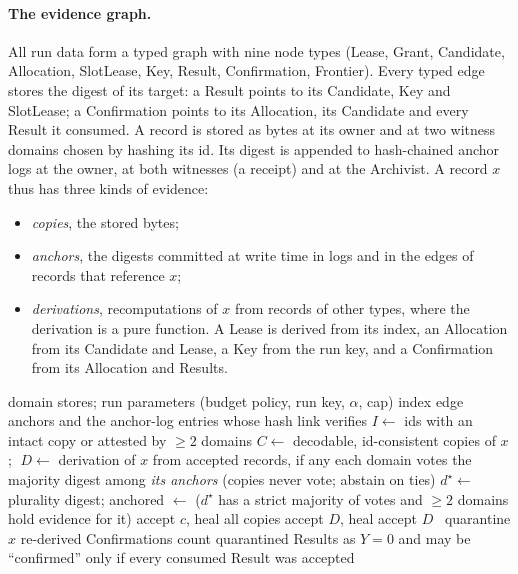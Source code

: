 \documentclass[pdflatex,sn-mathphys-num]{sn-jnl}
\theoremstyle{thmstyleone}
\theoremstyle{thmstyletwo}
\theoremstyle{thmstylethree}
\begin{document}
\paragraph{The evidence graph.} All run data form a typed graph with nine node types (Lease, Grant, Candidate, Allocation, SlotLease, Key, Result, Confirmation, Frontier). Every typed edge stores the digest of its target: a Result points to its Candidate, Key and SlotLease; a Confirmation points to its Allocation, its Candidate and every Result it consumed. A record is stored as bytes at its owner and at two witness domains chosen by hashing its id. Its digest is appended to hash-chained anchor logs at the owner, at both witnesses (a receipt) and at the Archivist. A record $x$ thus has three kinds of evidence:
\begin{itemize}
\item \emph{copies}, the stored bytes;
\item \emph{anchors}, the digests committed at write time in logs and in the edges of records that reference $x$;
\item \emph{derivations}, recomputations of $x$ from records of other types, where the derivation is a pure function. A Lease is derived from its index, an Allocation from its Candidate and Lease, a Key from the run key, and a Confirmation from its Allocation and Results.
\end{itemize}

\begin{algorithm}[!htbp]
\caption{TWGR (typed-witness graph repair).}\label{alg:twgr}
\begin{algorithmic}[1]
\Require domain stores; run parameters (budget policy, run key, $\alpha$, cap)
\State index edge anchors and the anchor-log entries whose hash link verifies
\State $I\gets$ ids with an intact copy or attested by $\ge 2$ domains 
  \State $C\gets$ decodable, id-consistent copies of $x$; $\;D\gets$ derivation of $x$ from accepted records, if any
  \State each domain votes the majority digest among \emph{its anchors} (copies never vote; abstain on ties)
  \State $d^\star\gets$ plurality digest; anchored $\gets$ ($d^\star$ has a strict majority of votes and $\ge 2$ domains hold evidence for it)
   accept $c$, heal all copies 
   accept $D$, heal 
   accept $D$ 
  \Else\ quarantine $x$
  \EndIf
 \EndFor
\EndFor
\State re-derived Confirmations count quarantined Results as $Y=0$ and may be ``confirmed'' only if every consumed Result was accepted
\end{algorithmic}
\end{algorithm}
\end{document}
